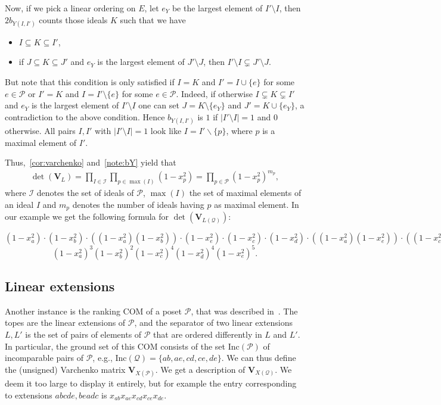 \documentclass[12pt]{amsart}
\theoremstyle{plain}
\numberwithin{Lemma}{\DefaultNumberTheoremWithin}
\numberwithin{Claim}{\DefaultNumberTheoremWithin}
\numberwithin{Theorem}{\DefaultNumberTheoremWithin}
\numberwithin{Corollary}{\DefaultNumberTheoremWithin}
\numberwithin{Proposition}{\DefaultNumberTheoremWithin}
\numberwithin{Conjecture}{\DefaultNumberTheoremWithin}
\numberwithin{Situation}{\DefaultNumberTheoremWithin}
\numberwithin{Note}{\DefaultNumberTheoremWithin}
\theoremstyle{definition}
\numberwithin{Definition}{\DefaultNumberTheoremWithin}
\theoremstyle{definition}
\numberwithin{Question}{\DefaultNumberTheoremWithin}
\theoremstyle{definition}
\numberwithin{Problem}{\DefaultNumberTheoremWithin}
\theoremstyle{remark} \newtheorem{Remark}{Remark}
\numberwithin{Remark}{\DefaultNumberTheoremWithin}
\theoremstyle{remark}
\numberwithin{Example}{\DefaultNumberTheoremWithin}
\numberwithin{Case}{Lemma}
\numberwithin{Step}{Lemma}
\begin{document}
Now, if we pick a linear ordering on $E$, let $e_Y$ be the largest element of $I'\setminus I$, then $2b_{Y(I,I')}$ counts those ideals $K$ such that we have 
\begin{itemize}
 \item $I\subseteq K\subseteq I'$,
 \item if $J\subseteq K\subseteq J'$ and $e_Y$ is the largest element of $J'\setminus J$, then $I'\setminus I \subsetneq J'\setminus J$.
\end{itemize}
But note that this condition is only satisfied if $I=K$ and $I'=I\cup \{e\} $ for some $e\in\mathcal{P}$ or $I'=K$ and $I=I'\setminus \{e\} $ for some $e\in\mathcal{P}$. Indeed, if otherwise $I\subsetneq K \subsetneq I'$ and $e_Y$ is the largest element of $I'\setminus I$ one can set $J = K \setminus \{e_Y\}$ and $J'=K \cup \{e_Y\}$, a contradiction to the above condition. 
Hence $b_{Y(I,I')}$ is $1$ if $|I'\setminus I|=1$ and $0$ otherwise. All pairs $I,I'$ with $|I'\setminus I|=1$ look like $I = I'\backslash \{p\}$, where $p$ is a maximal element of $I'$.


Thus,~\ref{cor:varchenko} and~\ref{note:bY} yield that 
  \begin{align*}
     \det (\mathbf{V}_L) = \prod_{I \in \mathcal{I}} \prod_{p\in \max(I)}(1-x_p^2)=\prod_{p\in \mathcal{P}}(1-x_p^2)^{m_p},
   \end{align*}
where $\mathcal{I}$ denotes the set of ideals of $\mathcal{P}$, $\max(I)$ the set of maximal elements of an ideal $I$ and $m_p$ denotes the number of ideals having $p$ as maximal element.
In our example we get the following formula for $\det (\mathbf{V}_{L(\mathcal{Q})})$: 

\noindent$(1-x_a^2) \cdot(1-x_b^2)\cdot((1-x_a^2)(1-x_b^2))\cdot(1-x_e^2)\cdot(1-x_c^2)\cdot(1-x_d^2)\cdot((1-x_a^2)(1-x_e^2))\cdot((1-x_c^2)(1-x_d^2))\cdot((1-x_c^2)(1-x_e^2))\cdot((1-x_d^2)(1-x_e^2))\cdot((1-x_c^2)(1-x_d^2)(1-x_e^2))=$
\[(1-x_a^2)^3 (1-x_b^2)^2  (1-x_c^2)^4 (1-x_d^2)^4 (1-x_e^2)^5.\]




\subsection{Linear extensions}



Another instance is the ranking COM of a poset $\mathcal{P}$, that was described in~\cite{BCK}. The topes are the linear extensions of $\mathcal{P}$, and the separator of two linear extensions $L, L'$ is the set of pairs of elements of $\mathcal{P}$ that are ordered differently in $L$ and $L'$. In particular, the ground set of this COM consists of the set $\mathrm{Inc}(\mathcal{P})$ of incomparable pairs of $\mathcal{P}$, e.g., $\mathrm{Inc}(\mathcal{Q})=\{ab, ae, cd, ce, de\}$. We can thus define the (unsigned) Varchenko matrix $\mathbf{V}_{X(\mathcal{P})}$. 
We get a description of $\mathbf{V}_{X(\mathcal{Q})}$. We deem it too large to display it entirely, but for example the entry corresponding to extensions $abcde, beadc$ is $x_{ab}x_{ae}x_{cd}x_{ce}x_{de}$.
\end{document}
